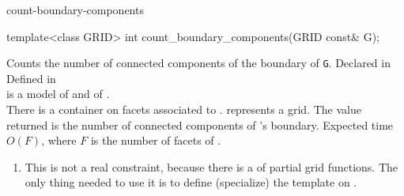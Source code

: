 \begin{Label}{count-boundary-components}
\end{Label}


\begin{example}
template<class GRID>
int count\_boundary\_components(GRID const& G);
\end{example}

Counts the number of connected components of the boundary of {\tt G}.
Declared in \\
Defined  in \\

 is a model of 
 and of
.\\
There is a 
container on facets
associated to  .
 represents a  grid.
The value returned is the number of connected components of 's boundary.
Expected time $O(F)$, where $F$ is the number of facets of .



\begin{enumerate}
\item \label{note-cbc-partial-gf}
This is not a real constraint, because there is a 
of partial grid functions.
The only thing needed to use it is to define (specialize)
the 
template on .
\end{enumerate}

